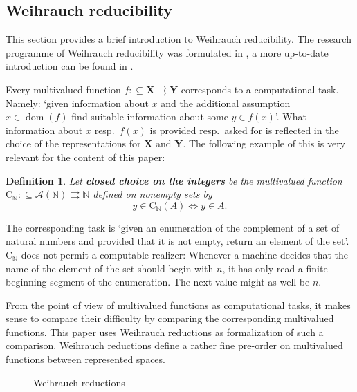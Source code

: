 \documentclass{eptcs-modified}
\newtheorem{definition}[theorem]{Definition}
\newcommand{\dom}{\operatorname{dom}}
\newcommand{\mto}{\rightrightarrows}
\newcommand{\demph}{\textbf}
\newcommand{\C}{\textrm{C}}
\newcommand{\NN}{\mathbb{N}}
\newcommand{\XX}{\mathbf{X}}
\newcommand{\YY}{\mathbf{Y}}
\begin{document}
		\subsection{Weihrauch reducibility}
			This section provides a brief introduction to Weihrauch reducibility.
			The research programme of Weihrauch reducibility was formulated in \cite{MR2099383}, a more up-to-date introduction can be found in \cite{MR3350999}.

			Every multivalued function $f:\subseteq\XX\mto\YY$ corresponds to a computational task.
			Namely: \lq given information about $x$ and the additional assumption $x\in \dom(f)$ find suitable information about some $y\in f(x)$\rq.
			What information about $x$ resp.\ $f(x)$ is provided resp.\ asked for is reflected in the choice of the representations for $\XX$ and $\YY$.
			The following example of this is very relevant for the content of this paper:
			\begin{definition}
				Let \demph{closed choice on the integers} be the multivalued function $\C_\mathbb{N} : \subseteq \mathcal{A}(\mathbb{N}) \mto \mathbb{N}$ defined on nonempty sets by
				\[ y\in\C_\mathbb{N}(A)\Leftrightarrow y\in A. \]
			\end{definition}
			The corresponding task is \lq given an enumeration of the complement of a set of natural numbers and provided that it is not empty, return an element of the set\rq.
			$\C_\NN$ does not permit a computable realizer:
			Whenever a machine decides that the name of the element of the set should begin with $n$, it has only read a finite beginning segment of the enumeration.
			The next value might as well be $n$.

			From the point of view of multivalued functions as computational tasks, it makes sense to compare their difficulty by comparing the corresponding multivalued functions.
			This paper uses Weihrauch reductions as formalization of such a comparison.
			Weihrauch reductions define a rather fine pre-order on multivalued functions between represented spaces.

			\begin{wrapfigure}{r}{3.5cm}
				\vspace{-.2cm}
				\caption{Weihrauch reductions}\label{fig:Wheirauch reduction}
				\vspace{-.8cm}
			\end{wrapfigure}
			
\end{document}
